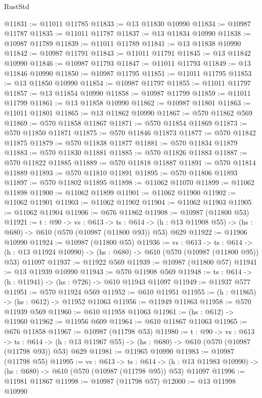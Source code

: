 \begin{lexlean}{RustStd}
\begin{coremodule}
@11831 := @11011 @11785
@11833 := @13 @11830 @10990
@11834 := @10987 @11787
@11835 := @11011 @11787
@11837 := @13 @11834 @10990
@11838 := @10987 @11789
@11839 := @11011 @11789
@11841 := @13 @11838 @10990
@11842 := @10987 @11791
@11843 := @11011 @11791
@11845 := @13 @11842 @10990
@11846 := @10987 @11793
@11847 := @11011 @11793
@11849 := @13 @11846 @10990
@11850 := @10987 @11795
@11851 := @11011 @11795
@11853 := @13 @11850 @10990
@11854 := @10987 @11797
@11855 := @11011 @11797
@11857 := @13 @11854 @10990
@11858 := @10987 @11799
@11859 := @11011 @11799
@11861 := @13 @11858 @10990
@11862 := @10987 @11801
@11863 := @11011 @11801
@11865 := @13 @11862 @10990
@11867 := @570 @11862 @569
@11869 := @570 @11858 @11867
@11871 := @570 @11854 @11869
@11873 := @570 @11850 @11871
@11875 := @570 @11846 @11873
@11877 := @570 @11842 @11875
@11879 := @570 @11838 @11877
@11881 := @570 @11834 @11879
@11883 := @570 @11830 @11881
@11885 := @570 @11826 @11883
@11887 := @570 @11822 @11885
@11889 := @570 @11818 @11887
@11891 := @570 @11814 @11889
@11893 := @570 @11810 @11891
@11895 := @570 @11806 @11893
@11897 := @570 @11802 @11895
@11898 := @11062 @11070
@11899 := @11062 @11898
@11900 := @11062 @11899
@11901 := @11062 @11900
@11902 := @11062 @11901
@11903 := @11062 @11902
@11904 := @11062 @11903
@11905 := @11062 @11904
@11906 := @676 @11862
@11908 := @10987 (@11800 @53)
@11921 := {t : @90} ->
  {vs : @613} ->
  {ts : @614} -> (h : @13 @11908 @55) -> (hs : @680) -> @610 (@570 (@10987 (@11800 @93)) @53) @629
@11922 := @11906 @10990
@11924 := @10987 (@11800 @55)
@11936 := {vs : @613} ->
  {ts : @614} ->
  (h : @13 @11924 @10990) -> (hs : @680) -> @610 (@570 (@10987 (@11800 @95)) @53) @11097
@11937 := @11922 @569
@11939 := @10987 (@11800 @57)
@11941 := @13 @11939 @10990
@11943 := @570 @11908 @569
@11948 := {ts : @614} -> (h : @11941) -> (hs : @726) -> @610 @11943 @11097
@11949 := @11937 @577
@11951 := @570 @11924 @569
@11952 := @610 @11951
@11955 := (h : @11865) -> (hs : @612) -> @11952 @11063
@11956 := @11949 @11863
@11958 := @570 @11939 @569
@11960 := @610 @11958 @11063
@11961 := (hs : @612) -> @11960
@11962 := @11956 @609
@11964 := @610 @11867 @11063
@11965 := @676 @11858
@11967 := @10987 (@11798 @53)
@11980 := {t : @90} ->
  {vs : @613} ->
  {ts : @614} -> (h : @13 @11967 @55) -> (hs : @680) -> @610 (@570 (@10987 (@11798 @93)) @53) @629
@11981 := @11965 @10990
@11983 := @10987 (@11798 @55)
@11995 := {vs : @613} ->
  {ts : @614} ->
  (h : @13 @11983 @10990) -> (hs : @680) -> @610 (@570 (@10987 (@11798 @95)) @53) @11097
@11996 := @11981 @11867
@11998 := @10987 (@11798 @57)
@12000 := @13 @11998 @10990

\end{coremodule}
\end{lexlean}
